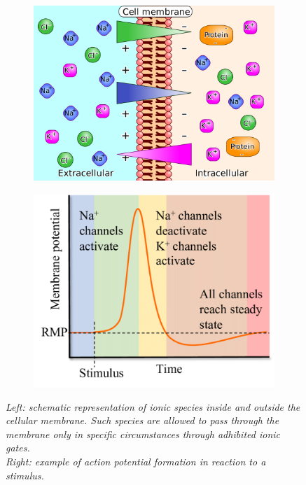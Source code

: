 \documentclass[12pt, a4paper]{report}
\begin{document}
\begin{figure}[H]
	\begin{minipage}{\linewidth}
		\centering
		\begin{minipage}{0.45\linewidth}
			\begin{figure}[H]
				\includegraphics[width=\linewidth]{AP1.png}
				
			\end{figure}
		\end{minipage}
		\hspace{0.05\linewidth}
		\begin{minipage}{0.45\linewidth}
			\begin{figure}[H]
				\includegraphics[width=\linewidth]{AP2.png}
				
			\end{figure}
		\end{minipage}
		
	\end{minipage}
\caption{\textit{Left: schematic representation of ionic species inside and outside the cellular membrane. Such species are allowed to pass through the membrane only in specific circumstances through adhibited ionic gates. \\
Right: example of action potential formation in reaction to a stimulus. \cite{43}}}\label{membrane}
\end{figure}
\end{document}
